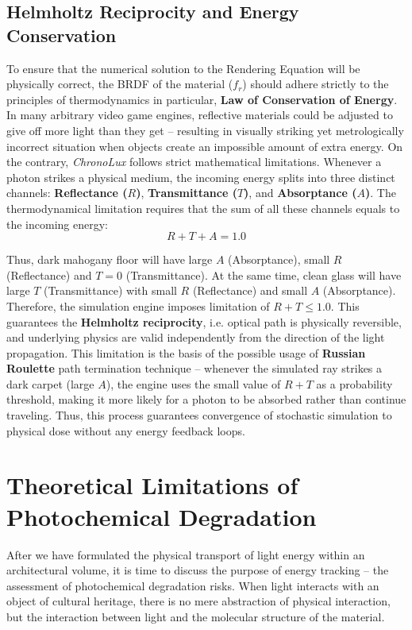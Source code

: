 \subsection{Helmholtz Reciprocity and Energy Conservation}
To ensure that the numerical solution to the Rendering Equation will be physically correct, the BRDF of the material ($f_r$) should adhere strictly to the principles of thermodynamics in particular, \textbf{Law of Conservation of Energy}. In many arbitrary video game engines, reflective materials could be adjusted to give off more light than they get – resulting in visually striking yet metrologically incorrect situation when objects create an impossible amount of extra energy. On the contrary, \textit{ChronoLux} follows strict mathematical limitations. Whenever a photon strikes a physical medium, the incoming energy splits into three distinct channels: \textbf{Reflectance ($R$)}, \textbf{Transmittance ($T$)}, and \textbf{Absorptance ($A$)}. The thermodynamical limitation requires that the sum of all these channels equals to the incoming energy:
\begin{equation}
    R + T + A = 1.0
\end{equation}

Thus, dark mahogany floor will have large $A$ (Absorptance), small $R$ (Reflectance) and $T=0$ (Transmittance). At the same time, clean glass will have large $T$ (Transmittance) with small $R$ (Reflectance) and small $A$ (Absorptance). Therefore, the simulation engine imposes limitation of $R + T \le 1.0$. This guarantees the \textbf{Helmholtz reciprocity}, i.e. optical path is physically reversible, and underlying physics are valid independently from the direction of the light propagation. This limitation is the basis of the possible usage of \textbf{Russian Roulette} path termination technique – whenever the simulated ray strikes a dark carpet (large $A$), the engine uses the small value of $R+T$ as a probability threshold, making it more likely for a photon to be absorbed rather than continue traveling. Thus, this process guarantees convergence of stochastic simulation to physical dose without any energy feedback loops.

\section{Theoretical Limitations of Photochemical Degradation}
After we have formulated the physical transport of light energy within an architectural volume, it is time to discuss the purpose of energy tracking – the assessment of photochemical degradation risks. When light interacts with an object of cultural heritage, there is no mere abstraction of physical interaction, but the interaction between light and the molecular structure of the material.

